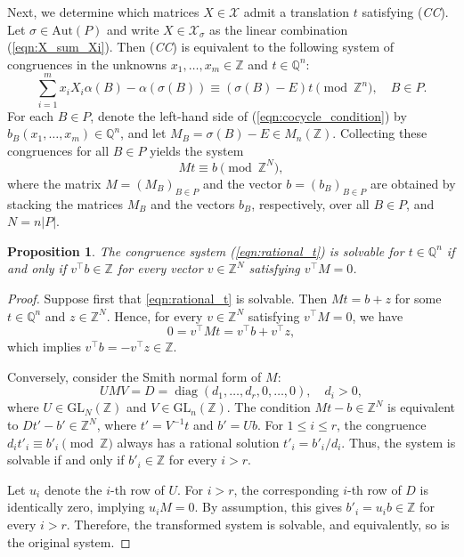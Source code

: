 \documentclass[draft]{adm-paper}
\newtheorem{proposition}[theorem]{Proposition}
\theoremstyle{definition}
\begin{document}
Next, we determine which matrices $X\in \mathcal{X}$ admit a translation $t$ satisfying (\textit{CC}).
Let $\sigma \in \mathrm{Aut}(P)$ and write $X\in \mathcal{X}_\sigma$ as the linear
combination (\ref{eqn:X_sum_Xi}). Then (\textit{CC}) is equivalent to the following system of congruences in the
unknowns $x_1,\dots,x_m\in\mathbb{Z}$ and $t\in\mathbb{Q}^n$:
\begin{equation}\label{eqn:cocycle_condition}
  \sum_{i=1}^{m}x_iX_i\alpha(B)-\alpha(\sigma(B))
  \equiv
  (\sigma(B)-E)t
  \pmod{\mathbb{Z}^n},
  \quad B\in P.
\end{equation}
For each $B\in P$, denote the left-hand side of (\ref{eqn:cocycle_condition}) by
$b_B(x_1,\dots,x_m)\in\mathbb{Q}^n$, and let $M_B=\sigma(B)-E\in M_n(\mathbb{Z})$.
Collecting these congruences for all $B\in P$ yields the system
\begin{equation}\label{eqn:rational_t}
  Mt\equiv b \pmod{\mathbb{Z}^N},
\end{equation}
where the matrix $M=(M_B)_{B\in P}$ and the vector $b=(b_B)_{B\in P}$ are obtained by stacking the matrices $M_B$ and
the vectors $b_B$, respectively, over all $B\in P$, and $N=n|P|$.


\begin{proposition}
  The congruence system (\ref{eqn:rational_t}) is solvable for $t \in \mathbb{Q}^n$ if and only if
  $v^\top b \in \mathbb{Z}$ for every vector $v \in \mathbb{Z}^N$ satisfying $v^\top M = 0$.
\end{proposition}
\begin{proof}
Suppose first that \eqref{eqn:rational_t} is solvable. Then
$Mt=b+z$ for some $t\in\mathbb Q^n$ and $z\in\mathbb Z^N$. Hence, for every
$v\in\mathbb Z^N$ satisfying $v^\top M=0$, we have
\[
0=v^\top Mt=v^\top b+v^\top z,
\]
which implies $v^\top b=-v^\top z\in\mathbb Z$.

Conversely, consider the Smith normal form of $M$:
\[
UMV=D=\operatorname{diag}(d_1,\dots,d_r,0,\dots,0),\quad d_i>0,
\]
where $U \in \mathrm{GL}_N(\mathbb{Z})$ and $V \in \mathrm{GL}_n(\mathbb{Z})$.
The condition $Mt-b\in\mathbb Z^N$ is equivalent to
$Dt'-b'\in\mathbb Z^N$, where $t'=V^{-1}t$ and $b'=Ub$.
For $1\le i\le r$, the congruence $d_it'_i\equiv b'_i\pmod{\mathbb Z}$
always has a rational solution $t'_i=b'_i/d_i$. Thus, the system is solvable if and only if
$b'_i\in\mathbb Z$ for every $i>r$.

Let $u_i$ denote the $i$-th row of $U$. For $i>r$, the corresponding $i$-th row of $D$ is identically zero, implying $u_i M = 0$. By assumption, this gives $b'_i = u_i b \in \mathbb{Z}$ for every $i > r$. Therefore, the transformed system is solvable, and equivalently, so is the original system.
\end{proof}
\end{document}
